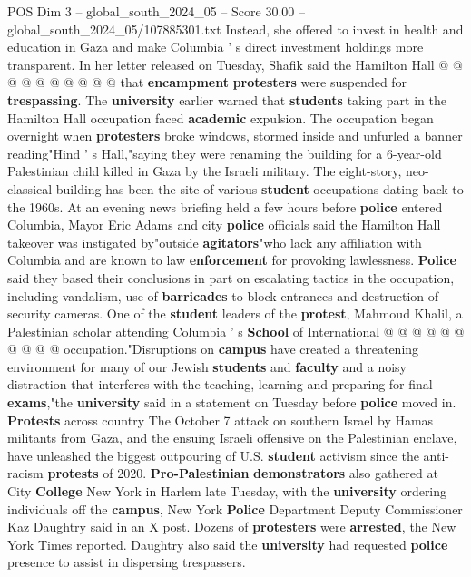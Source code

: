 \begin{textsample}{POS Dim 3 – global\_south\_2024\_05 – Score 30.00 – global\_south\_2024\_05/107885301.txt}
Instead, she offered to invest in health and education in Gaza and make Columbia ' s direct investment holdings more transparent.
In her letter released on Tuesday, Shafik said the Hamilton Hall @ @ @ @ @ @ @ @ @ @ that \textbf{encampment} \textbf{protesters} were suspended for \textbf{trespassing}.
The \textbf{university} earlier warned that \textbf{students} taking part in the Hamilton Hall occupation faced \textbf{academic} expulsion.
The occupation began overnight when \textbf{protesters} broke windows, stormed inside and unfurled a banner reading"Hind ' s Hall,"saying they were renaming the building for a 6-year-old Palestinian child killed in Gaza by the Israeli military.
The eight-story, neo-classical building has been the site of various \textbf{student} occupations dating back to the 1960s.
At an evening news briefing held a few hours before \textbf{police} entered Columbia, Mayor Eric Adams and city \textbf{police} officials said the Hamilton Hall takeover was instigated by"outside \textbf{agitators}"who lack any affiliation with Columbia and are known to law \textbf{enforcement} for provoking lawlessness. \textbf{Police} said they based their conclusions in part on escalating tactics in the occupation, including vandalism, use of \textbf{barricades} to block entrances and destruction of security cameras.
One of the \textbf{student} leaders of the \textbf{protest}, Mahmoud Khalil, a Palestinian scholar attending Columbia ' s \textbf{School} of International @ @ @ @ @ @ @ @ @ @ occupation."Disruptions on \textbf{campus} have created a threatening environment for many of our Jewish \textbf{students} and \textbf{faculty} and a noisy distraction that interferes with the teaching, learning and preparing for final \textbf{exams},"the \textbf{university} said in a statement on Tuesday before \textbf{police} moved in. \textbf{Protests} across country The October 7 attack on southern Israel by Hamas militants from Gaza, and the ensuing Israeli offensive on the Palestinian enclave, have unleashed the biggest outpouring of U.S. \textbf{student} activism since the anti-racism \textbf{protests} of 2020. \textbf{Pro-Palestinian} \textbf{demonstrators} also gathered at City \textbf{College} New York in Harlem late Tuesday, with the \textbf{university} ordering individuals off the \textbf{campus}, New York \textbf{Police} Department Deputy Commissioner Kaz Daughtry said in an X post.
Dozens of \textbf{protesters} were \textbf{arrested}, the New York Times reported.
Daughtry also said the \textbf{university} had requested \textbf{police} presence to assist in dispersing trespassers.

\end{textsample}
